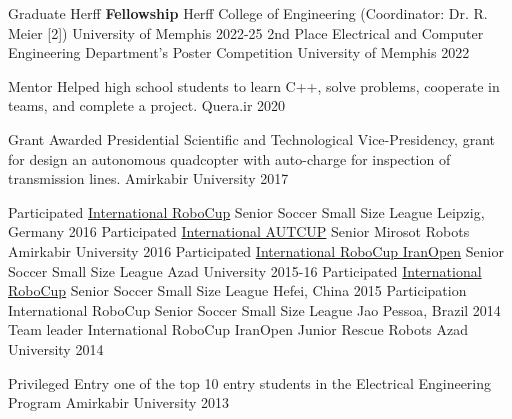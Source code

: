 
\begin{cvhonors}

  \cvhonor
  {Graduate Herff \textbf{Fellowship}}
  {Herff College of Engineering (Coordinator: Dr. R. Meier [2])}
  {University of Memphis}
  {2022-25}
  \cvhonor
    {2nd Place}
        {Electrical and Computer Engineering Department's Poster Competition}
    {University of Memphis}
	{2022}

\cvhonor
    {Mentor} %
    {Helped high school students to learn C++, solve problems, cooperate in teams, and complete a project.} %
    {Quera.ir} %
    {2020} %
    
  \cvhonor
    {Grant Awarded} %
    {Presidential Scientific and Technological Vice-Presidency, grant for design an autonomous quadcopter with auto-charge for inspection of transmission lines.} %
    {Amirkabir University} %
    {2017} %

      \cvhonor
    {Participated}
    {\href{https://en.wikipedia.org/wiki/RoboCup}{International RoboCup} Senior Soccer Small Size League}
    {Leipzig, Germany}
	{2016}
  \cvhonor
      {Participated}
      {\href{http://autcup.aut.ac.ir/2018/visitorpages/default.aspx?itemid=3}{International AUTCUP} Senior Mirosot Robots}
      {Amirkabir University}
	   {2016}
  \cvhonor
    {Participated}
    {\href{https://en.wikipedia.org/wiki/IranOpen}{International RoboCup IranOpen} Senior Soccer Small Size League}
    { Azad University}
	{2015-16}
  \cvhonor
    {Participated}
    {\href{https://en.wikipedia.org/wiki/RoboCup}{International RoboCup} Senior Soccer Small Size League}
    {Hefei, China}
	{2015}
  \cvhonor
    {Participation}
    {International RoboCup Senior Soccer Small Size League}
    {Jao Pessoa, Brazil}
	{2014}
  \cvhonor
    {Team leader}
    {International RoboCup IranOpen Junior Rescue Robots}
    { Azad University}
	{2014}

\cvhonor
 {Privileged Entry}
 {one of the top 10 entry students in the Electrical Engineering Program}
 {Amirkabir University}
 {2013}


\end{cvhonors}
